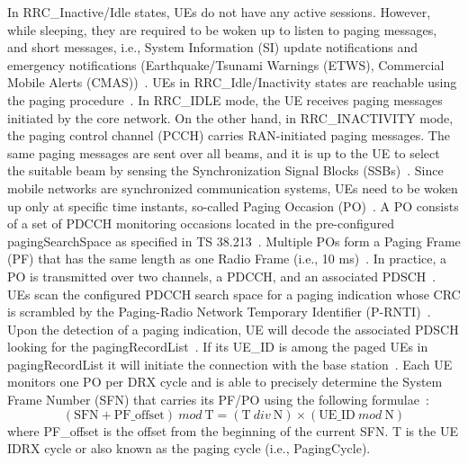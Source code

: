 \documentclass[]{IEEEtran}
\begin{document}
In RRC\_Inactive/Idle states, UEs do not have any active sessions.
However, while sleeping, they are required to be woken up to listen to paging messages, and short messages, i.e., System Information (SI) update notifications and emergency notifications (Earthquake/Tsunami Warnings (ETWS), Commercial Mobile Alerts (CMAS))~\cite{TS_38.321,awada2017radio}. 
UEs in RRC\_Idle/Inactivity states are reachable using the paging procedure~\cite{verma2019energy}.
    In RRC\_IDLE mode, the UE receives paging messages initiated by the core network.
On the other hand, in RRC\_INACTIVITY mode, the paging control channel (PCCH) carries RAN-initiated paging messages.
The same paging messages are sent over all beams, and it is up to the UE to select the suitable beam by sensing the Synchronization Signal Blocks (SSBs)~\cite{agiwal2022enhanced}.
Since mobile networks are synchronized communication systems, UEs need to be woken up only at specific time instants, so-called Paging Occasion (PO)~\cite{lauridsen2021study}. 
A PO consists of a set of PDCCH monitoring occasions located in the pre-configured pagingSearchSpace as specified in TS 38.213~\cite{3gpp_nr_2022-1_38.213}. 
Multiple POs form a Paging Frame (PF) that has the same length as one Radio Frame (i.e., 10 ms)~\cite{li_radio_2022}. 
In practice, a PO is transmitted over two channels, a PDCCH, and an associated PDSCH~\cite{esswie_power_2022}. 
UEs scan the configured PDCCH search space for a paging indication whose CRC is scrambled by the Paging-Radio Network Temporary Identifier (P-RNTI)~\cite{TS_38.321}. 
Upon the detection of a paging indication, UE will decode the associated PDSCH looking for the pagingRecordList~\cite{3gpp_nr_2022-10_38.304}.
If its UE\_ID is among the paged UEs in pagingRecordList it will initiate the connection with the base station~\cite{ramazanali2017modeling}.
Each UE monitors one PO per DRX cycle and is able to precisely determine the System Frame Number (SFN) that carries its PF/PO using the following formulae~\cite{3gpp_nr_2022-10_38.304}:
\begin{equation}
(\textrm{SFN} + \textrm{PF}\_{\textrm{offset}})~mod~\textrm{T} = (\textrm{T}~div~\textrm{N})\times(\textrm{UE}\_{\textrm{ID}}~mod~\textrm{N})
\label{equ:spectral-efficiency}
\end{equation}
where PF\_offset is the offset from the beginning of the current SFN.
T is the UE IDRX cycle or also known as the paging cycle (i.e., PagingCycle).
\end{document}
